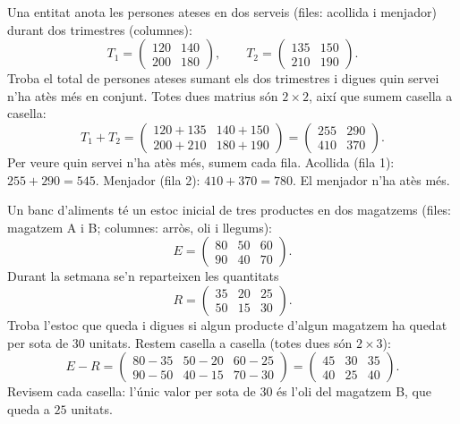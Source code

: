 \begin{exresolt}
Una entitat anota les persones ateses en dos serveis (files: acollida i menjador)
durant dos trimestres (columnes):
\[
T_1=\begin{pmatrix} 120 & 140 \\ 200 & 180 \end{pmatrix},\qquad
T_2=\begin{pmatrix} 135 & 150 \\ 210 & 190 \end{pmatrix}.
\]
Troba el total de persones ateses sumant els dos trimestres i digues quin servei
n'ha atès més en conjunt.
\solucio
Totes dues matrius són $2\times 2$, així que sumem casella a casella:
\[
T_1+T_2=\begin{pmatrix} 120+135 & 140+150 \\ 200+210 & 180+190 \end{pmatrix}
       =\begin{pmatrix} 255 & 290 \\ 410 & 370 \end{pmatrix}.
\]
Per veure quin servei n'ha atès més, sumem cada fila. Acollida (fila 1):
$255 + 290 = 545$. Menjador (fila 2): $410 + 370 = 780$. El menjador n'ha atès més.
\end{exresolt}

\begin{exresolt}
Un banc d'aliments té un estoc inicial de tres productes en dos magatzems
(files: magatzem A i B; columnes: arròs, oli i llegums):
\[
E=\begin{pmatrix} 80 & 50 & 60 \\ 90 & 40 & 70 \end{pmatrix}.
\]
Durant la setmana se'n reparteixen les quantitats
\[
R=\begin{pmatrix} 35 & 20 & 25 \\ 50 & 15 & 30 \end{pmatrix}.
\]
Troba l'estoc que queda i digues si algun producte d'algun magatzem ha quedat per
sota de $30$ unitats.
\solucio
Restem casella a casella (totes dues són $2\times 3$):
\[
E-R=\begin{pmatrix} 80-35 & 50-20 & 60-25 \\ 90-50 & 40-15 & 70-30 \end{pmatrix}
   =\begin{pmatrix} 45 & 30 & 35 \\ 40 & 25 & 40 \end{pmatrix}.
\]
Revisem cada casella: l'únic valor per sota de $30$ és l'oli del magatzem B,
que queda a $25$ unitats.
\end{exresolt}

